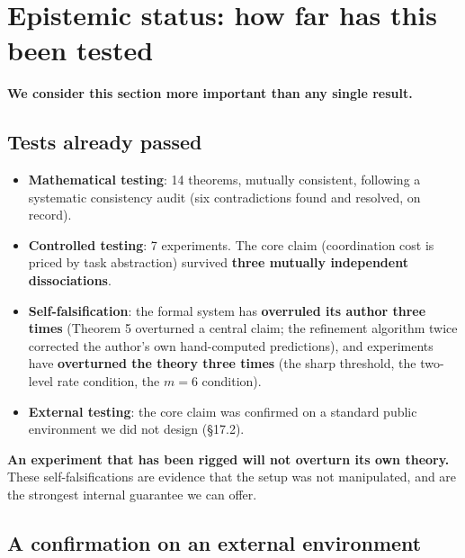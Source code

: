 \documentclass[11pt]{article}
\providecommand{\tightlist}{%
  \setlength{\itemsep}{0pt}\setlength{\parskip}{0pt}}
\renewenvironment{quote}
  {\def\FrameCommand{{\color{gray!60}\vrule width 2pt}\hspace{8pt}}%
   \MakeFramed{\advance\hsize-\width \FrameRestore}\begin{itshape}}
  {\end{itshape}\endMakeFramed}
\begin{document}
\hypertarget{epistemic-status-how-far-has-this-been-tested}{%
\section{Epistemic status: how far has this been tested}\label{epistemic-status-how-far-has-this-been-tested}}

\textbf{We consider this section more important than any single result.}

\hypertarget{tests-already-passed}{%
\subsection{Tests already passed}\label{tests-already-passed}}

\begin{itemize}
\tightlist
\item
  \textbf{Mathematical testing}: 14 theorems, mutually consistent, following a systematic consistency audit (six contradictions found and resolved, on record).
\item
  \textbf{Controlled testing}: 7 experiments. The core claim (coordination cost is priced by task abstraction) survived \textbf{three mutually independent dissociations}.
\item
  \textbf{Self-falsification}: the formal system has \textbf{overruled its author three times} (Theorem 5 overturned a central claim; the refinement algorithm twice corrected the author's own hand-computed predictions), and experiments have \textbf{overturned the theory three times} (the sharp threshold, the two-level rate condition, the \(m=6\) condition).
\item
  \textbf{External testing}: the core claim was confirmed on a standard public environment we did not design (\S{}17.2).
\end{itemize}

\begin{quote}
\textbf{An experiment that has been rigged will not overturn its own theory.} These self-falsifications are evidence that the setup was not manipulated, and are the strongest internal guarantee we can offer.
\end{quote}

\hypertarget{a-confirmation-on-an-external-environment}{%
\subsection{A confirmation on an external environment}\label{a-confirmation-on-an-external-environment}}
\end{document}
